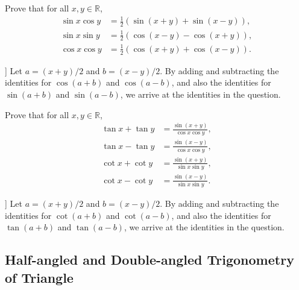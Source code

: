 \documentclass[12pt,a4paper]{memoir}
\theoremstyle{definition}
\begin{document}
	\begin{question}[name=Sine and Cosine Product-to-Sum]
		Prove that for all $x,y\in \mathbb R$,
		\begin{align}
			\sin x \cos y &= \frac{1}{2}\left(\sin(x+y) + \sin(x-y)\right), \label{id:sin-cos-product-to-sum} \\
			\sin x \sin y &= \frac{1}{2}\left(\cos(x-y) - \cos(x+y)\right), \label{id:sin-product-to-difference} \\
			\cos x \cos y &= \frac{1}{2}\left(\cos(x+y) + \cos(x-y)\right). \label{id:cos-product-to-sum}
		\end{align}
	\end{question}


\begin{solution}[name=Proof of Sine and Cosine Product-to-Sum]]
	Let $a=(x+y)/2$ and $b=(x-y)/2$. By adding and subtracting the identities for $\cos(a+b)$ and $\cos(a-b)$, and also the identities for $\sin(a+b)$ and $\sin(a-b)$, we arrive at the identities in the question.
\end{solution}



	\begin{question}[name=Tangent and Cotangent Sum-to-Product]
		Prove that for all $x,y\in \mathbb R$,
		\begin{align}
			\tan x + \tan y &= \frac{\sin(x+y)}{\cos x \cos y}, \label{id:tan-sum-to-product} \\
			\tan x - \tan y &= \frac{\sin(x-y)}{\cos x \cos y}, \label{id:tan-difference-to-product} \\
			\cot x + \cot y &= \frac{\sin(x+y)}{\sin x \sin y}, \label{id:cot-sum-to-product} \\
			\cot x - \cot y &= \frac{\sin(x-y)}{\sin x \sin y}. \label{id:cot-difference-to-product} 
		\end{align}
	\end{question}


\begin{solution}[name=Proof of Tangent and Cotangent Sum-to-Product]]
	Let $a=(x+y)/2$ and $b=(x-y)/2$. By adding and subtracting the identities for $\cot(a+b)$ and $\cot(a-b)$, and also the identities for $\tan(a+b)$ and $\tan(a-b)$, we arrive at the identities in the question.
\end{solution}


\subsection{Half-angled and Double-angled Trigonometry of Triangle}
\end{document}

